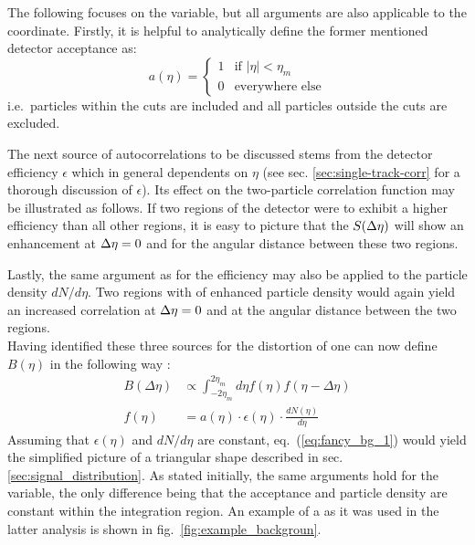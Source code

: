 The following focuses on the \deta variable, but all arguments are also applicable to the \dphi coordinate. Firstly, it is helpful to analytically define the former mentioned detector acceptance as:
\begin{equation}
  \label{eq:acc}
  a(\eta ) =
  \begin{cases}
  1 & \text{if } |\eta| < \eta_m \\
  0 & \text{everywhere else}
  \end{cases}
\end{equation}
i.e.\ particles within the cuts are included and all particles outside the cuts are excluded.

The next source of autocorrelations to be discussed stems from the detector efficiency $\epsilon$ which in general dependents on $\eta$ (see sec. \ref{sec:single-track-corr} for a thorough discussion of $\epsilon$). Its effect on the two-particle correlation function may be illustrated as follows. If two regions of the detector were to exhibit a higher efficiency than all other regions, it is easy to picture that the $S(\Delta\eta)$ will show an enhancement at $\Delta\eta = 0$ and for the angular distance \deta between these two regions. 

Lastly, the same argument as for the efficiency may also be applied to the particle density $dN/d\eta$. Two regions with of enhanced particle density would again yield an increased correlation at $\Delta\eta = 0$ and at the angular distance between the two regions.\\

Having identified these three sources for the distortion of \Sig one can now define $B(\eta)$ in the following way \cite{Xu2013, Schuster2013}:
\begin{align}
  \label{eq:fancy_bg_1}
  B(\Delta\eta) &\propto \int_{-2\eta_m}^{2\eta_m} d\eta f(\eta) f(\eta - \Delta\eta) \\
  \label{eq:fancy_bg_2}
  f(\eta) &= a(\eta) \cdot \epsilon(\eta) \cdot \frac{dN(\eta)}{d\eta}
\end{align}
Assuming that $\epsilon(\eta)$ and $dN/d\eta$ are constant, eq.~(\ref{eq:fancy_bg_1}) would yield the simplified picture of a triangular shape described in sec. \ref{sec:signal_distribution}. As stated initially, the same arguments hold for the \dphi variable, the only difference being that the acceptance and particle density are constant within the integration region. An example of a \B as it was used in the latter analysis is shown in fig.~\ref{fig:example_backgroun}.\\

